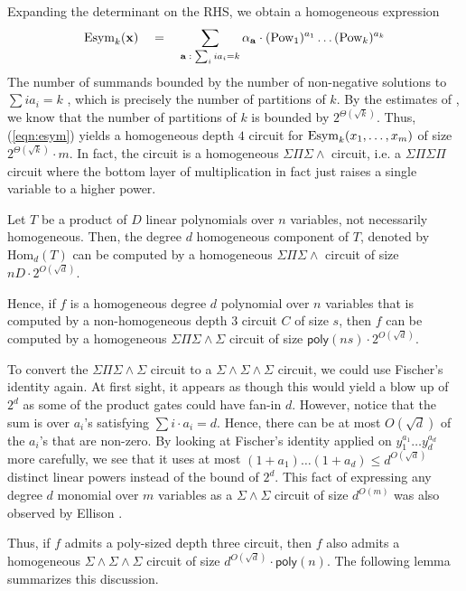 \documentclass[12pt]{report}
\newcommand{\SPSP}{\Sigma\Pi\Sigma\Pi}
\newcommand{\SPSE}{\Sigma\Pi\Sigma\wedge}
\newcommand{\poly}{\mathsf{poly}}
\begin{document}
Expanding the determinant on the RHS, we obtain a homogeneous expression
\begin{equation}\label{eqn:esym}
\mathrm{Esym}_k(\mathbf{x}) \quad = \quad \sum_{\mathbf{a}\;:\; \sum_i ia_i = k} \alpha_{\mathbf{a}} \cdot (\mathrm{Pow}_1)^{a_1}\dots (\mathrm{Pow}_k)^{a_k}
\end{equation}
The number of summands bounded by the number of non-negative solutions to $\sum i a_i = k$ , which is precisely the number of partitions of $k$. By the estimates of \cite{hr18}, we know that the number of partitions of $k$ is bounded by $2^{\Theta(\sqrt{k})}$. Thus, (\ref{eqn:esym}) yields a homogeneous depth $4$ circuit for $\mathrm{Esym}_k(x_1,\dots, x_m)$ of size $2^{\Theta(\sqrt{k})} \cdot m$. In fact, the circuit is a homogeneous $\SPSE$ circuit, i.e. a $\SPSP$ circuit where the bottom layer of multiplication in fact just raises a single variable to a higher power. 

\begin{corollary}\label{cor:d3-d5}
Let $T$ be a product of $D$ linear polynomials over $n$ variables, not necessarily homogeneous. Then, the degree $d$ homogeneous component of $T$, denoted by $\mathrm{Hom}_d(T)$ can be computed by a homogeneous $\SPSE$ circuit of size $nD\cdot 2^{O(\sqrt{d})}$. 

Hence, if $f$ is a homogeneous degree $d$ polynomial over $n$ variables that is computed by a non-homogeneous depth $3$ circuit $C$ of size $s$, then $f$ can be computed by a homogeneous $\Sigma\Pi\Sigma\!\wedge\!\Sigma$ circuit of size $\poly(ns) \cdot 2^{O(\sqrt{d})}$. 
\end{corollary}

To convert the $\Sigma\Pi\Sigma\!\wedge\!\Sigma$ circuit to a $\Sigma\!\wedge\!\Sigma\!\wedge\!\Sigma$ circuit, we could use Fischer's identity again. At first sight, it appears as though this would yield a blow up of $2^d$ as some of the product gates could have fan-in $d$. However, notice that the sum is over $a_i$'s satisfying $\sum i\cdot a_i = d$. Hence, there can be at most $O(\sqrt{d})$ of the $a_i$'s that are non-zero. By looking at Fischer's identity applied on $y_1^{a_1}\dots y_{d}^{a_d}$ more carefully, we see that it uses at most $(1+a_1)\dots (1+a_d) \leq d^{O(\sqrt{d})}$ distinct linear powers instead of the \naive bound of $2^{d}$. This fact of expressing any degree $d$ monomial over $m$ variables as a $\Sigma\!\wedge\!\Sigma$ circuit of size $d^{O(m)}$ was also observed by Ellison \cite{ellison}. 

Thus, if $f$ admits a poly-sized depth three circuit, then $f$ also admits a homogeneous $\Sigma\!\wedge\!\Sigma\!\wedge\!\Sigma$ circuit of size $d^{O(\sqrt{d})} \cdot \poly(n)$. The following lemma summarizes this discussion. 
\end{document}
